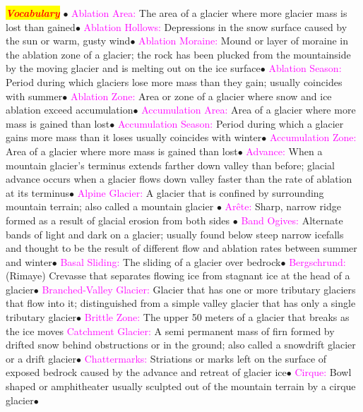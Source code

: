 \documentclass{article}
\newcommand{\ddd}{$\bullet$}
\newcommand{\red}[1]{\textcolor{red}{#1}}
\newcommand{\pink}[1]{\textcolor{magenta}{#1}}
\newcommand{\mysection}[1]{\colorbox{yellow}{\textbf{\textit{\red{#1}}}}}
\newcommand{\vocab}[1]{{\pink{#1}}}
\begin{document}
\begin{multicols*}{4}
	\mysection{Vocabulary} 
		\ddd
		\vocab{        Ablation Area: } The area of a glacier where more glacier mass is lost than gained\ddd
		\vocab{        Ablation Hollows: } Depressions in the snow surface caused by the sun or warm, gusty wind\ddd
		\vocab{        Ablation Moraine: } Mound or layer of moraine in the ablation zone of a glacier; the rock has been plucked from the mountainside by the moving glacier and is melting out on the ice surface\ddd
		\vocab{        Ablation Season: } Period during which glaciers lose more mass than they gain; usually coincides with summer\ddd
		\vocab{        Ablation Zone: } Area or zone of a glacier where snow and ice ablation exceed accumulation\ddd
		\vocab{        Accumulation Area: } Area of a glacier where more mass is gained than lost\ddd
		\vocab{        Accumulation Season: } Period during which a glacier gains more mass than it loses usually coincides with winter\ddd
		\vocab{        Accumulation Zone: } Area of a glacier where more mass is gained than lost\ddd
		\vocab{        Advance: } When a mountain glacier’s terminus extends farther down valley than before; glacial advance occurs when a glacier flows down valley faster than the rate of ablation at its terminus\ddd
		\vocab{        Alpine Glacier: } A glacier that is confined by surrounding mountain terrain; also called a mountain glacier \ddd
		\vocab{        Arête: } Sharp, narrow ridge formed as a result of glacial erosion from both sides \ddd 
		\vocab{        Band Ogives: } Alternate bands of light and dark on a glacier; usually found below steep narrow icefalls and thought to be the result of different flow and ablation rates between summer and winter\ddd
		\vocab{        Basal Sliding: } The sliding of a glacier over bedrock\ddd
		\vocab{        Bergschrund: } (Rimaye) Crevasse that separates flowing ice from stagnant ice at the head of a glacier\ddd
		\vocab{        Branched-Valley Glacier: } Glacier that has one or more tributary glaciers that flow into it; distinguished from a simple valley glacier that has only a single tributary glacier\ddd
		\vocab{       Brittle Zone: }The upper 50 meters of a glacier that breaks as the ice moves
		\vocab{        Catchment Glacier: } A semi permanent mass of firn formed by drifted snow behind obstructions or in the ground; also called a snowdrift glacier or a drift glacier\ddd
		\vocab{        Chattermarks: } Striations or marks left on the surface of exposed bedrock caused by the advance and retreat of glacier ice\ddd
		\vocab{        Cirque: } Bowl shaped or amphitheater usually sculpted out of the mountain terrain by a cirque glacier\ddd

\end{multicols*}
\end{document}
